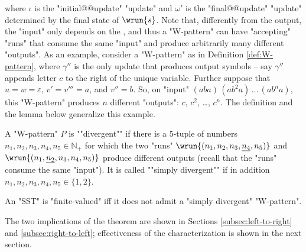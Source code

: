 \documentclass{theoretics}
\begin{document}
where $\iota$ is the "initial@@update" "update"
and $\omega'$ is the "final@@update" "update"
determined by the final state of $\wrun{s}$.
\AP
Note that, differently from the output, the "input" 
only depends on the ,
and thus a "W-pattern" can have "accepting" "runs" that 
consume the same "input" and produce arbitrarily many 
different "outputs".
As an example, consider a "W-pattern" as in Definition \ref{def:W-pattern}, 
where $\gamma''$ is the only update that produces output symbols
-- say $\gamma''$ appends letter $c$ to the right of the unique variable. 
Further suppose that $u=w=\varepsilon$, $v'=v'''=a$, and $v''=b$. 
So, on "input" $(aba) \, (a b^2 a) \, \dots \, (a b^n a)$,
this "W-pattern" produces $n$ different "outputs":
$c$, $c^2$, \dots, $c^n$. 
The definition and the lemma below generalize this example.

\begin{definition}\label{def:skewed-W-pattern}
A "W-pattern" $P$ is ""divergent"" 
if there is a $5$-tuple of numbers $n_1,n_2,n_3,n_4,n_5\in\mathbb{N}_+$
for which the two "runs" $\wrun{(n_1,n_2,n_3,\underline{n_4},n_5)}$
and $\wrun{(n_1,\underline{n_2},n_3,n_4,n_5)}$ produce different outputs
(recall that the "runs" consume the same "input").
It is called ""simply divergent"" if in addition
$n_1,n_2,n_3,n_4,n_5\in\{1,2\}$.
\end{definition}

\begin{theorem}\label{thm:finite-valued}
An "SST" is "finite-valued" iff it does not admit a
"simply divergent" "W-pattern".
\end{theorem}

The two implications of the theorem are
shown in Sections \ref{subsec:left-to-right}
and \ref{subsec:right-to-left}; effectiveness
of the characterization is shown in the next
section.



\end{document}
